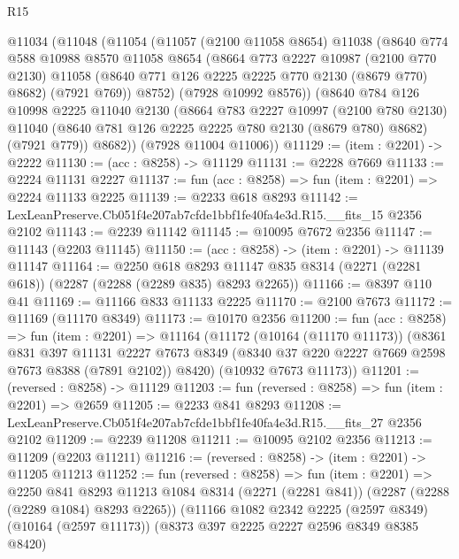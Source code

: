 \begin{lexlean}{R15}
\begin{coremodule}
  @11034
    (@11048
      (@11054
        (@11057
          (@2100 @11058 @8654)
          @11038
          (@8640
            @774
            @588
            @10988
            @8570
            @11058
            @8654
            (@8664
              @773
              @2227
              @10987
              (@2100 @770 @2130)
              @11058
              (@8640 @771 @126 @2225 @2225 @770 @2130 (@8679 @770) @8682)
              (@7921 @769))
            @8752)
          (@7928 @10992 @8576))
        (@8640
          @784
          @126
          @10998
          @2225
          @11040
          @2130
          (@8664
            @783
            @2227
            @10997
            (@2100 @780 @2130)
            @11040
            (@8640 @781 @126 @2225 @2225 @780 @2130 (@8679 @780) @8682)
            (@7921 @779))
          @8682))
      (@7928 @11004 @11006))
@11129 := (item : @2201) -> @2222
@11130 := (acc : @8258) -> @11129
@11131 := @2228 @7669
@11133 := @2224 @11131 @2227
@11137 := fun (acc : @8258) => fun (item : @2201) => @2224 @11133 @2225
@11139 := @2233 @618 @8293
@11142 := LexLeanPreserve.Cb051f4e207ab7cfde1bbf1fe40fa4e3d.R15.__fits_15 @2356 @2102
@11143 := @2239 @11142
@11145 := @10095 @7672 @2356
@11147 := @11143 (@2203 @11145)
@11150 := (acc : @8258) -> (item : @2201) -> @11139 @11147
@11164 := @2250
    @618
    @8293
    @11147
    @835
    @8314
    (@2271 (@2281 @618))
    (@2287 (@2288 (@2289 @835) @8293 @2265))
@11166 := @8397 @110 @41
@11169 := @11166 @833 @11133 @2225
@11170 := @2100 @7673
@11172 := @11169 (@11170 @8349)
@11173 := @10170 @2356
@11200 := fun (acc : @8258) =>
  fun (item : @2201) =>
  @11164
    (@11172
      (@10164 (@11170 @11173))
      (@8361
        @831
        @397
        @11131
        @2227
        @7673
        @8349
        (@8340 @37 @220 @2227 @7669 @2598 @7673 @8388 (@7891 @2102))
        @8420)
      (@10932 @7673 @11173))
@11201 := (reversed : @8258) -> @11129
@11203 := fun (reversed : @8258) => fun (item : @2201) => @2659
@11205 := @2233 @841 @8293
@11208 := LexLeanPreserve.Cb051f4e207ab7cfde1bbf1fe40fa4e3d.R15.__fits_27 @2356 @2102
@11209 := @2239 @11208
@11211 := @10095 @2102 @2356
@11213 := @11209 (@2203 @11211)
@11216 := (reversed : @8258) -> (item : @2201) -> @11205 @11213
@11252 := fun (reversed : @8258) =>
  fun (item : @2201) =>
  @2250
    @841
    @8293
    @11213
    @1084
    @8314
    (@2271 (@2281 @841))
    (@2287 (@2288 (@2289 @1084) @8293 @2265))
    (@11166
      @1082
      @2342
      @2225
      (@2597 @8349)
      (@10164 (@2597 @11173))
      (@8373 @397 @2225 @2227 @2596 @8349 @8385 @8420)

\end{coremodule}
\end{lexlean}
